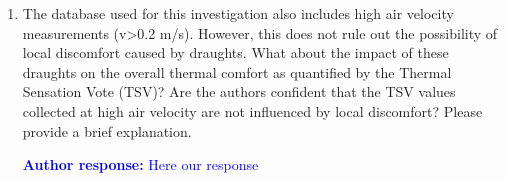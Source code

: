\documentclass[a4paper, 10pt]{letter}
\newcommand{\response}[1]{\textcolor{blue}{\textbf{Author response:} #1}}
\begin{document}
\begin{letter}
\begin{enumerate}
\response{
            Here our response
            }

\item The database used for this investigation also includes high air velocity measurements (v>0.2 m/s). However, this does not rule out the possibility of local discomfort caused by draughts. What about the impact of these draughts on the overall thermal comfort as quantified by the Thermal Sensation Vote (TSV)? Are the authors confident that the TSV values collected at high air velocity are not influenced by local discomfort? Please provide a brief explanation.

\response{
            Here our response
            }

        \end{enumerate}


            


\end{letter}
\end{document}
